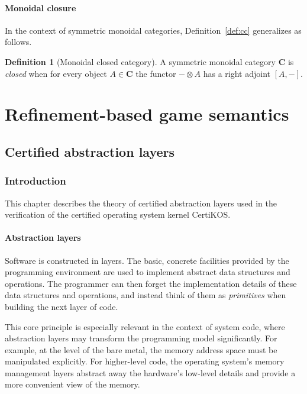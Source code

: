 \documentclass[11pt,oneside]{book}
\theoremstyle{definition}
\newtheorem{definition}[theorem]{Definition}
\begin{document}
\subsection{Monoidal closure}

In the context of symmetric monoidal categories,
Definition~\ref{def:cc} generalizes as follows.

\begin{definition}[Monoidal closed category]
A symmetric monoidal category $\mathbf{C}$ is \emph{closed}
when for every object $A \in \mathbf{C}$
the functor ${-} \otimes A$
has a right adjoint $[A, {-}]$.
\end{definition}




\part{Refinement-based game semantics} \label{part:rbgs}

\chapter{Certified abstraction layers} \label{sec:cal} %

\section{Introduction} %

This chapter describes
the theory of certified abstraction layers
used in the verification of
the certified operating system kernel CertiKOS.

\subsection{Abstraction layers} %

Software is constructed in layers.
The basic, concrete facilities provided by the programming environment
are used to implement abstract data structures and operations.
The programmer can then forget the implementation details
of these data structures and operations,
and instead think of them as \emph{primitives}
when building the next layer of code.

This core principle is especially relevant
in the context of system code,
where abstraction layers
may transform the programming model significantly.
For example,
at the level of the bare metal,
the memory address space must be manipulated explicitly.
For higher-level code,
the operating system's memory management layers
abstract away the hardware's low-level details and
provide a more convenient view of the memory.
\end{document}
